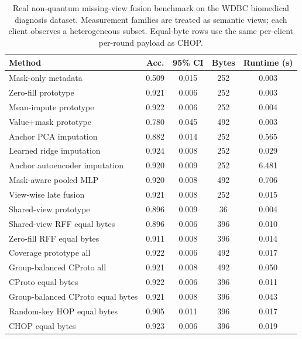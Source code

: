 \begin{table}[t]
\centering
\caption{Real non-quantum missing-view fusion benchmark on the WDBC biomedical diagnosis dataset. Measurement families are treated as semantic views; each client observes a heterogeneous subset. Equal-byte rows use the same per-client per-round payload as CHOP.}
\label{tab:if-wdbc-fusion}
\scriptsize
\setlength{\tabcolsep}{3pt}
\renewcommand{\arraystretch}{0.94}
\begin{tabular}{lcccc}
\toprule
Method & Acc. & 95\% CI & Bytes & Runtime (s) \\
\midrule
Mask-only metadata & 0.509 & 0.015 & 252 & 0.003 \\
Zero-fill prototype & 0.921 & 0.006 & 252 & 0.003 \\
Mean-impute prototype & 0.922 & 0.006 & 252 & 0.004 \\
Value+mask prototype & 0.780 & 0.045 & 492 & 0.003 \\
Anchor PCA imputation & 0.882 & 0.014 & 252 & 0.565 \\
Learned ridge imputation & 0.924 & 0.008 & 252 & 0.029 \\
Anchor autoencoder imputation & 0.920 & 0.009 & 252 & 6.481 \\
Mask-aware pooled MLP & 0.920 & 0.008 & 492 & 0.706 \\
View-wise late fusion & 0.921 & 0.008 & 252 & 0.015 \\
Shared-view prototype & 0.896 & 0.009 & 36 & 0.004 \\
Shared-view RFF equal bytes & 0.896 & 0.006 & 396 & 0.010 \\
Zero-fill RFF equal bytes & 0.911 & 0.008 & 396 & 0.014 \\
Coverage prototype all & 0.922 & 0.006 & 492 & 0.017 \\
Group-balanced CProto all & 0.921 & 0.008 & 492 & 0.050 \\
CProto equal bytes & 0.922 & 0.006 & 396 & 0.011 \\
Group-balanced CProto equal bytes & 0.921 & 0.008 & 396 & 0.043 \\
Random-key HOP equal bytes & 0.905 & 0.011 & 396 & 0.017 \\
CHOP equal bytes & 0.923 & 0.006 & 396 & 0.019 \\
\bottomrule
\end{tabular}
\end{table}
